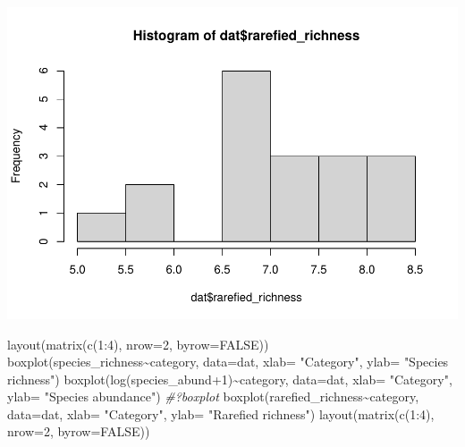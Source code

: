 \documentclass[
]{article}
\newenvironment{Shaded}{\begin{snugshade}}{\end{snugshade}}
\newcommand{\AttributeTok}[1]{\textcolor[rgb]{0.77,0.63,0.00}{#1}}
\newcommand{\CommentTok}[1]{\textcolor[rgb]{0.56,0.35,0.01}{\textit{#1}}}
\newcommand{\ConstantTok}[1]{\textcolor[rgb]{0.00,0.00,0.00}{#1}}
\newcommand{\DecValTok}[1]{\textcolor[rgb]{0.00,0.00,0.81}{#1}}
\newcommand{\FunctionTok}[1]{\textcolor[rgb]{0.00,0.00,0.00}{#1}}
\newcommand{\NormalTok}[1]{#1}
\newcommand{\SpecialCharTok}[1]{\textcolor[rgb]{0.00,0.00,0.00}{#1}}
\newcommand{\StringTok}[1]{\textcolor[rgb]{0.31,0.60,0.02}{#1}}
\begin{document}
\includegraphics{birdsdataanalysis_files/figure-latex/unnamed-chunk-5-6.pdf}

\begin{Shaded}
\begin{Highlighting}[]
\FunctionTok{layout}\NormalTok{(}\FunctionTok{matrix}\NormalTok{(}\FunctionTok{c}\NormalTok{(}\DecValTok{1}\SpecialCharTok{:}\DecValTok{4}\NormalTok{), }\AttributeTok{nrow=}\DecValTok{2}\NormalTok{, }\AttributeTok{byrow=}\ConstantTok{FALSE}\NormalTok{))}
\FunctionTok{boxplot}\NormalTok{(species\_richness}\SpecialCharTok{\textasciitilde{}}\NormalTok{category, }\AttributeTok{data=}\NormalTok{dat, }\AttributeTok{xlab=} \StringTok{"Category"}\NormalTok{, }\AttributeTok{ylab=} \StringTok{"Species richness"}\NormalTok{)}
\FunctionTok{boxplot}\NormalTok{(}\FunctionTok{log}\NormalTok{(species\_abund}\SpecialCharTok{+}\DecValTok{1}\NormalTok{)}\SpecialCharTok{\textasciitilde{}}\NormalTok{category, }\AttributeTok{data=}\NormalTok{dat, }\AttributeTok{xlab=} \StringTok{"Category"}\NormalTok{, }\AttributeTok{ylab=} \StringTok{"Species abundance"}\NormalTok{)}
\CommentTok{\#?boxplot}
\FunctionTok{boxplot}\NormalTok{(rarefied\_richness}\SpecialCharTok{\textasciitilde{}}\NormalTok{category, }\AttributeTok{data=}\NormalTok{dat, }\AttributeTok{xlab=} \StringTok{"Category"}\NormalTok{, }\AttributeTok{ylab=} \StringTok{"Rarefied richness"}\NormalTok{)}
\FunctionTok{layout}\NormalTok{(}\FunctionTok{matrix}\NormalTok{(}\FunctionTok{c}\NormalTok{(}\DecValTok{1}\SpecialCharTok{:}\DecValTok{4}\NormalTok{), }\AttributeTok{nrow=}\DecValTok{2}\NormalTok{, }\AttributeTok{byrow=}\ConstantTok{FALSE}\NormalTok{))}
\end{Highlighting}
\end{Shaded}
\end{document}
